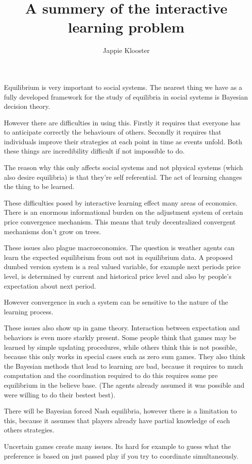 \documentclass{article}
\begin{document}
\author{Jappie Klooster}
\title{A summery of the interactive learning problem}

\maketitle

Equilibrium is very important to social systems. The nearest
thing we have as a fully developed framework for the study of
equilibria in social systems is Bayesian decision theory.

However there are difficulties in using this. Firstly it requires that
everyone has to anticipate correctly the behaviours of others.
Secondly it requires that individuals improve their strategies
at each point in time as events unfold.
Both these things are incredibility difficult if not impossible to do.

The reason why this only affects social systems and not physical systems
(which also desire equilibria) is that they're self referential.
The act of learning changes the thing to be learned.

These difficulties posed by interactive learning effect many areas of economics.
There is an enormous informational burden on the adjustment
system of certain price convergence mechanism. This means
that truly decentralized convergent mechanisms don't grow
on trees.

These issues also plague macroeconomics. The question
is weather agents can learn the expected equilibrium from
out not in equilibrium data.
A proposed dumbed version system is a real valued variable,
for example next periods price level, is determined by current
and historical price level and also by people's expectation
about next period.

However convergence in such a system can be sensitive to the
nature of the learning process.

These issues also show up in game theory. Interaction
between expectation and behaviors is even more starkly present.
Some people think that games may be learned by simple updating
procedures, while others think this is not possible, because
this only works in special cases such as zero sum games.
They also think the Bayesian methods that lead to learning
are bad, because it requires to much computation and the
coordination required to do this requires some pre equilibrium
in the believe base. (The agents already assumed it was
possible and were willing to do their bestest best).

There will be Bayesian forced Nash equilibria, however there is
a limitation to this, because it assumes that players already
have partial knowledge of each others strategies.

Uncertain games create many issues. Its hard for example
to guess what the preference is based on just passed play
if you try to coordinate simultaneously.
\end{document}
